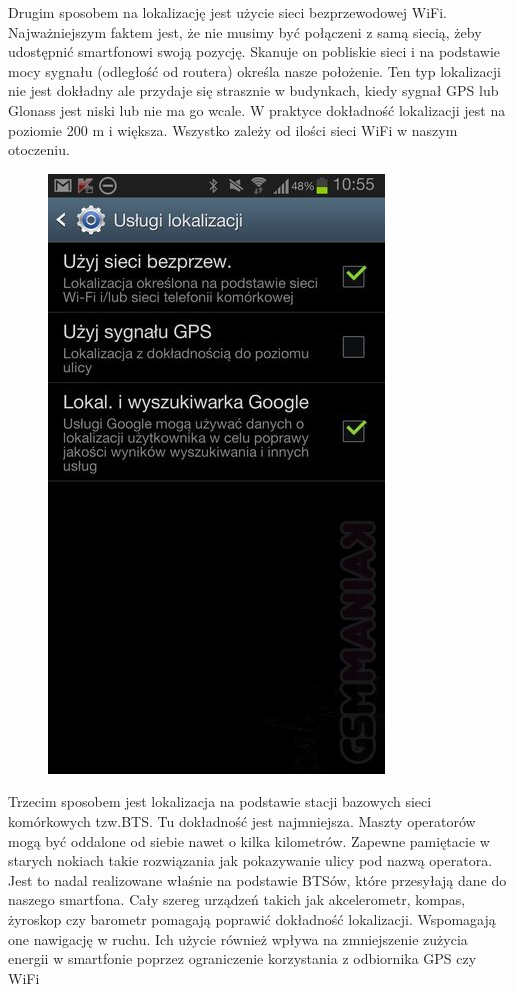 Drugim sposobem na lokalizację jest użycie sieci bezprzewodowej WiFi. Najważniejszym faktem jest, że nie musimy być połączeni z samą siecią, żeby udostępnić smartfonowi swoją pozycję. Skanuje on pobliskie sieci i na podstawie mocy sygnału (odległość od routera) określa nasze położenie. Ten typ lokalizacji nie jest dokładny ale przydaje się strasznie w budynkach, kiedy sygnał GPS lub Glonass jest niski lub nie ma go wcale. W praktyce dokładność lokalizacji jest na poziomie 200 m i większa. Wszystko zależy od ilości sieci WiFi w naszym otoczeniu.
\begin{figure}[H]
\centering
\includegraphics[scale=0.5]{czlonkowie/5/3ss.jpg}
\end{figure}
Trzecim sposobem jest lokalizacja na podstawie stacji bazowych sieci komórkowych tzw.BTS. Tu dokładność jest najmniejsza. Maszty operatorów mogą być oddalone od siebie nawet o kilka kilometrów. Zapewne pamiętacie w starych nokiach takie rozwiązania jak pokazywanie ulicy pod nazwą operatora. Jest to nadal realizowane właśnie na podstawie BTSów, które przesyłają dane do naszego smartfona. Cały szereg urządzeń takich jak akcelerometr, kompas, żyroskop czy barometr pomagają poprawić dokładność lokalizacji. Wspomagają one nawigację w ruchu. Ich użycie również wpływa na zmniejszenie zużycia energii w smartfonie poprzez ograniczenie korzystania z odbiornika GPS czy WiFi
